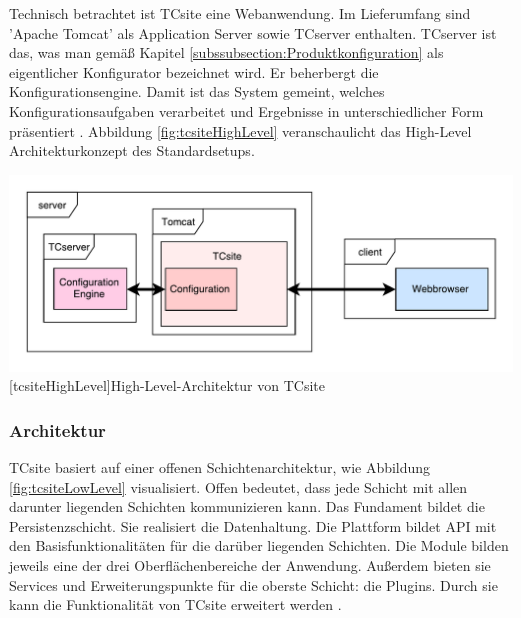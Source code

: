 \documentclass[12pt,a4paper,bibliography=totocnumbered,listof=totoc]{scrartcl}
\begin{document}
Technisch betrachtet ist TCsite eine Webanwendung. Im Lieferumfang sind 'Apache Tomcat' als Application Server sowie TCserver enthalten. TCserver ist das, was man gemäß Kapitel \ref{subssubsection:Produktkonfiguration} als eigentlicher Konfigurator bezeichnet wird. Er beherbergt die Konfigurationsengine. Damit ist das System gemeint, welches Konfigurationsaufgaben verarbeitet und Ergebnisse in unterschiedlicher Form präsentiert \citep{tactonTCsiteHandbook}. Abbildung \ref{fig:tcsiteHighLevel} veranschaulicht das High-Level Architekturkonzept des Standardsetups.

\vspace{1em}
\begin{minipage}{\linewidth}
	\centering
	\includegraphics[width=1\linewidth]{Abbildungen/tcsiteHighLevel.pdf}
	[tcsiteHighLevel]{High-Level-Architektur von TCsite}
	\label{fig:tcsiteHighLevel}
\end{minipage}
\vspace{1em}

\subsubsection{Architektur}

TCsite basiert auf einer offenen Schichtenarchitektur, wie Abbildung \ref{fig:tcsiteLowLevel} visualisiert. Offen bedeutet, dass jede Schicht mit allen darunter liegenden Schichten kommunizieren kann. Das Fundament bildet die Persistenzschicht. Sie realisiert die Datenhaltung. Die Plattform bildet API mit den Basisfunktionalitäten für die darüber liegenden Schichten. Die Module bilden jeweils eine der drei Oberflächenbereiche der Anwendung. Außerdem bieten sie Services und Erweiterungspunkte für die oberste Schicht: die Plugins. Durch sie kann die Funktionalität von TCsite erweitert werden \citep{tactonTCsiteDevelopmentManual}.
\end{document}

